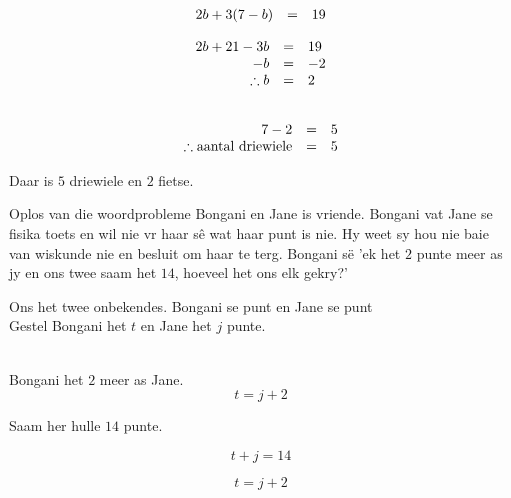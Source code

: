 \begin{aktiwiteit}{}
\begin{wex}
{
\begin{equation*}
\begin{array}{ccc}\hfill 2b+3(7-b)& =& 19\hfill \end{array}
\end{equation*}


\begin{equation*}
\begin{array}{ccl}
 \hfill 2b + 21 - 3b& =& 19\hfill \\
\hfill - b& =& -2\hfill \\
 \hfill \therefore b& =& 2\hfill 
\end{array}
\end{equation*}

\begin{equation*}
\begin{array}{ccl}
\\ \hfill  7 - 2 & =& 5\hfill \\
 \therefore \mbox{aantal driewiele}& =& 5
\end{array}
\end{equation*}

 Daar is $5$ driewiele en $2$ fietse.

}       
\end{wex}

\begin{wex}{Oplos van die woordprobleme}{
Bongani en Jane is vriende. Bongani vat Jane se fisika toets en wil nie vr haar s\^e wat haar punt is nie. Hy weet sy hou nie baie van wiskunde nie en besluit om haar te terg. Bongani s\"e 
'ek het $2$ punte meer as jy en ons twee saam het $14$, hoeveel het ons elk gekry?'}
{
Ons het twee onbekendes. Bongani se punt en Jane se punt 
\\Gestel Bongani het $t$ en Jane het $j$ punte. 

\\Bongani het $2$ meer as Jane.
\begin{equation*}
t=j+2
\end{equation*}

Saam her hulle $14$ punte.

\begin{equation*}
t+j=14
\end{equation*}

\begin{equation*}
t=j+2
\end{equation*}

}
\end{wex}
\end{aktiwiteit}
